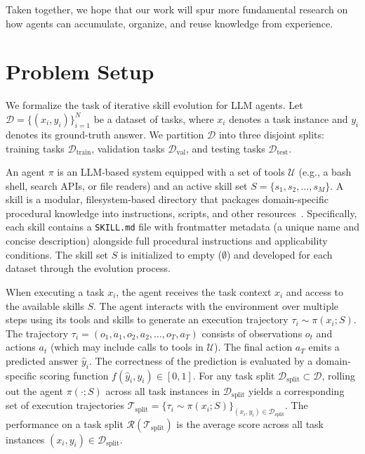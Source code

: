 \documentclass[11pt, a4paper, copyright, gr]{google}
\begin{document}
Taken together, we hope that our work will spur more fundamental research on how agents can accumulate, organize, and reuse knowledge from experience.


\section{Problem Setup}
\label{sec:problem_setup}

We formalize the task of iterative skill evolution for LLM agents. Let $\mathcal{D} = \{(x_i, y_i)\}_{i=1}^N$ be a dataset of tasks, where $x_i$ denotes a task instance and $y_i$ denotes its ground-truth answer. We partition $\mathcal{D}$ into three disjoint splits: training tasks $\mathcal{D}_{\text{train}}$, validation tasks $\mathcal{D}_{\text{val}}$, and testing tasks $\mathcal{D}_{\text{test}}$.

An agent $\pi$ is an LLM-based system equipped with a set of tools $\mathcal{U}$ (e.g., a bash shell, search APIs, or file readers) and an active skill set $S = \{s_1, s_2, \dots, s_M\}$. A skill is a modular, filesystem-based directory that packages domain-specific procedural knowledge into instructions, scripts, and other resources~\citep{zhang2025equipping,li2026skillsbench,chen2026skillcraftllmagentslearn, liu2026agenticskillsworkwild}. Specifically, each skill contains a \texttt{SKILL.md} file with frontmatter metadata (a unique name and concise description) alongside full procedural instructions and applicability conditions. The skill set $S$ is initialized to empty ($\emptyset$) and developed for each dataset through the evolution process.

When executing a task $x_i$, the agent receives the task context $x_i$ and access to the available skills $S$. The agent interacts with the environment over multiple steps using its tools and skills to generate an execution trajectory $\tau_i \sim \pi(x_i; S)$. The trajectory $\tau_i = (o_1, a_1, o_2, a_2, \dots, o_T, a_T)$ consists of observations $o_t$ and actions $a_t$ (which may include calls to tools in $\mathcal{U}$). The final action $a_T$ emits a predicted answer $\hat{y}_i$. The correctness of the prediction is evaluated by a domain-specific scoring function $f(\hat{y}_i, y_i) \in [0, 1]$. For any task split $\mathcal{D}_{\text{split}} \subset \mathcal{D}$, rolling out the agent $\pi(\cdot; S)$ across all task instances in $\mathcal{D}_{\text{split}}$ yields a corresponding set of execution trajectories $\mathcal{T}_{\text{split}} = \{ \tau_i \sim \pi(x_i; S) \}_{(x_i, y_i) \in \mathcal{D}_{\text{split}}}$. The performance on a task split $\mathcal{R}(\mathcal{T}_{\text{split}})$ is the average score across all task instances $(x_i, y_i) \in \mathcal{D}_{\text{split}}$.
\end{document}
